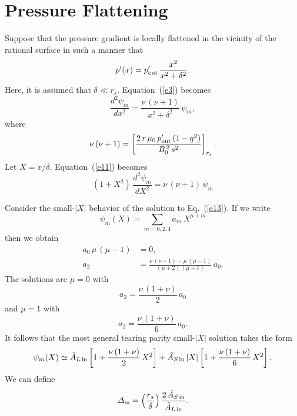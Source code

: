 \documentclass[12pt,prb,aps,notitlepage]{revtex4-1}
\begin{document}
\section{Pressure Flattening}
Suppose that the pressure gradient is locally flattened in the vicinity of the rational surface in such a manner that
\begin{equation}
p'(x) = p'_{\rm out}\,\frac{x^2}{x^2+\delta^2}.
\end{equation}
Here, it is assumed that $\delta\ll r_s$. 
Equation~(\ref{e3}) becomes 
\begin{equation}\label{e11}
\frac{d^2\psi_{m}}{dx^2} =\frac{\nu\,(\nu+1)}{x^2+\delta^2}\,\psi_{m},
\end{equation}
where 
\begin{equation}
\nu\,(\nu+1)=   \left[\frac{2\,r\,\mu_0\,p'_{\rm out}\,(1-q^2)}{B_0^{\,2}\,s^2}\right]_{r_s}.
\end{equation}
Let $X=x/\delta$. Equation~(\ref{e11}) becomes
\begin{equation}\label{e13}
(1+X^2)\,\frac{d^2\psi_m}{dX^2}= \nu\,(\nu+1)\,\psi_m
\end{equation}

Consider the small-$|X|$ behavior of the solution to Eq.~(\ref{e13}). If we write
\begin{equation}
\psi_m(X) = \sum_{m=0,2,4}a_m\,X^{\mu+m}
\end{equation}
then we obtain
\begin{align}
a_0\,\mu\,(\mu-1) &= 0,\\[0,5ex]
a_2 &= \frac{\nu\,(\nu+1)-\mu\,(\mu-1)}{(\mu+2)\,(\mu+1)}\,a_0.
\end{align}
The solutions are
$\mu=0$ with
\begin{equation}
a_2 =\frac{\nu\,(1+\nu)}{2}\,a_0
\end{equation}
and
$\mu=1$ with
\begin{equation}
a_2 = \frac{\nu\,(1+\nu)}{6}\,a_0.
\end{equation}
It follows that the most general tearing parity small-$|X|$ solution takes the form 
\begin{equation}\label{in}
\psi_m(X) \simeq \hat{A}_{L\,{\rm in}}\left[1+\frac{\nu\,(1+\nu)}{2}\,X^2\right] + \hat{A}_{S\,{\rm in}}\,|X|\left[1+\frac{\nu\,(1+\nu)}{6}\,X^2\right].
\end{equation}
We can define
\begin{equation}\label{din}
{\mit\Delta}_{\rm in} = \left(\frac{r_s}{\delta}\right)
\frac{2\,\hat{A}_{S \,{\rm in}}}{\hat{A}_{L\,{\rm in}}}.
\end{equation}
\end{document}
